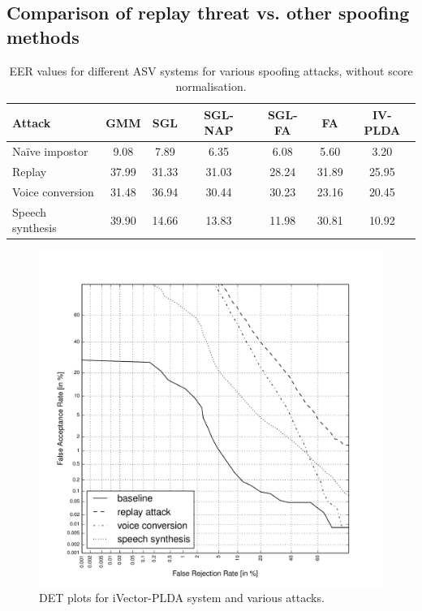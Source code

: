 \subsection{Comparison of replay threat vs. other spoofing methods}

\begin{table}
\begin{center}
    \begin{tabular}{ l || c c c c c c}
    \hline
     	 Attack & GMM & SGL & SGL-NAP & SGL-FA & FA & IV-PLDA \\ 

 \hline \hline
Na\"{i}ve impostor & 9.08 & 7.89 & 6.35 & 6.08 & 5.60 & 3.20\\ 
Replay & 37.99	& 31.33 & 31.03 & 28.24 & 31.89 & 25.95\\
Voice conversion & 31.48 & 36.94 & 30.44 & 30.23 & 23.16 & 20.45\\ 
Speech synthesis & 39.90 & 14.66 & 13.83 & 11.98 & 30.81 & 10.92\\ 
\hline
    \end{tabular}
    \caption{EER values for different ASV systems for various spoofing attacks, without score normalisation.}
		\label{tab::results_EER_4attacks}
   \end{center}
\end{table}


\begin{figure}
	\centering
	\includegraphics[width=1\linewidth]{Figs/DETs_IV_ss_vc_rp.pdf}
	\caption{DET plots for iVector-PLDA system and various attacks.}
	\label{fig::DETs_4attacks}
\end{figure}


